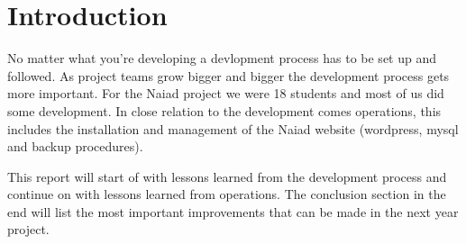 \section{Introduction}\label{sec:introduction}
No matter what you're developing a devlopment process has to be set up and followed.
As project teams grow bigger and bigger the development
process gets more important. For the Naiad project we were 18 students and most
of us did some development. In close relation to the development comes
operations, this includes the installation and management of the Naiad
website (wordpress, mysql and backup procedures).

This report will start of with lessons learned from the development
process and continue on with lessons learned from operations. The conclusion
section in the end will list the most important improvements that can be made
in the next year project.
